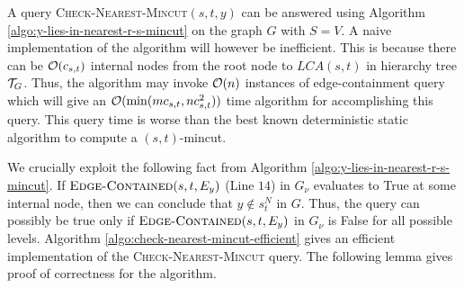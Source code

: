 A query \textsc{Check-Nearest-Mincut}$(s,t,y)$ can be answered using Algorithm \ref{algo:y-lies-in-nearest-r-s-mincut} on the graph $G$ with $S=V$. A naive implementation of the algorithm will however be inefficient. This is because there can be ${\cal O}(c_{s,t})$ internal nodes from the root node to $LCA(s,t)$ in hierarchy tree ${\cal T}_G$. Thus, the algorithm may invoke ${\cal O}(n)$ instances of edge-containment query which will give an ${\cal O}(\min(mc_{s,t},nc_{s,t}^2))$ time algorithm for accomplishing this query. This query time is worse than the best known deterministic static algorithm to compute a $(s,t)$-mincut. 

We crucially exploit the following fact from Algorithm \ref{algo:y-lies-in-nearest-r-s-mincut}. If $\textsc{Edge-Contained}(s,t,E_y)$ (Line $14$) in $G_\nu$ evaluates to True at some internal node, then we can conclude that $y \not \in s_t^N$ in $G$. Thus, the query can possibly be true only if $\textsc{Edge-Contained}(s,t,E_y)$ in $G_\nu$ is False for all possible levels. Algorithm \ref{algo:check-nearest-mincut-efficient} gives an efficient implementation of the \textsc{Check-Nearest-Mincut} query. The following lemma gives proof of correctness for the algorithm.

